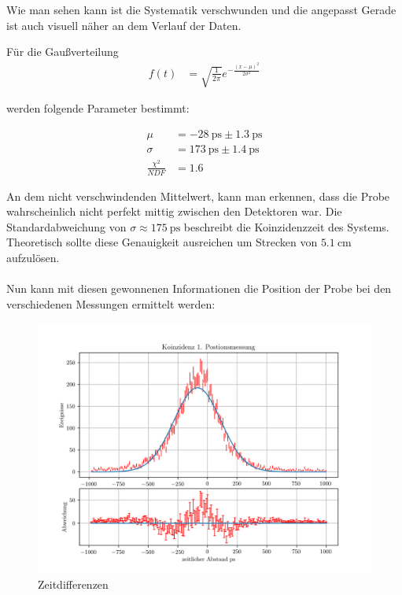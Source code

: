 \documentclass[12pt,twoside,a4paper]{scrartcl}
\begin{document}
					Wie man sehen kann ist die Systematik verschwunden und die angepasst Gerade ist auch visuell näher an dem Verlauf der Daten.

					Für die Gaußverteilung
					\begin{align*}
						f(t) &= \sqrt{\frac{1}{2 \pi}} e^{-\frac{(x-\mu)^2}{2 \sigma^2}}
					\end{align*}

					werden folgende Parameter bestimmt:

					\begin{align*}
						\mu &= \SI{-28}{\pico \second} \pm \SI{1.3}{\pico \second} \\
						\sigma &= \SI{173}{\pico \second} \pm \SI{1.4}{\pico \second} \\
						\frac{\chi^2}{NDF} &= 1.6
					\end{align*}

					An dem nicht verschwindenden Mittelwert, kann man erkennen, dass die Probe wahrscheinlich nicht perfekt mittig zwischen den Detektoren war.
					Die Standardabweichung von $\sigma \approx \SI{175}{\pico \second}$ beschreibt die Koinzidenzzeit des Systems. Theoretisch sollte diese Genauigkeit ausreichen um Strecken von $\SI{5.1}{\centi \metre}$ aufzulösen.
					 \\
					 \\

					 Nun kann mit diesen gewonnenen Informationen die Position der Probe bei den verschiedenen Messungen ermittelt werden:

					 \begin{figure}[H]
					 		\centering

								\includegraphics[width=\textwidth]{Plots/Time/1_Postionsmessung.png}

							\caption{Zeitdifferenzen}
					 \end{figure}
\end{document}
